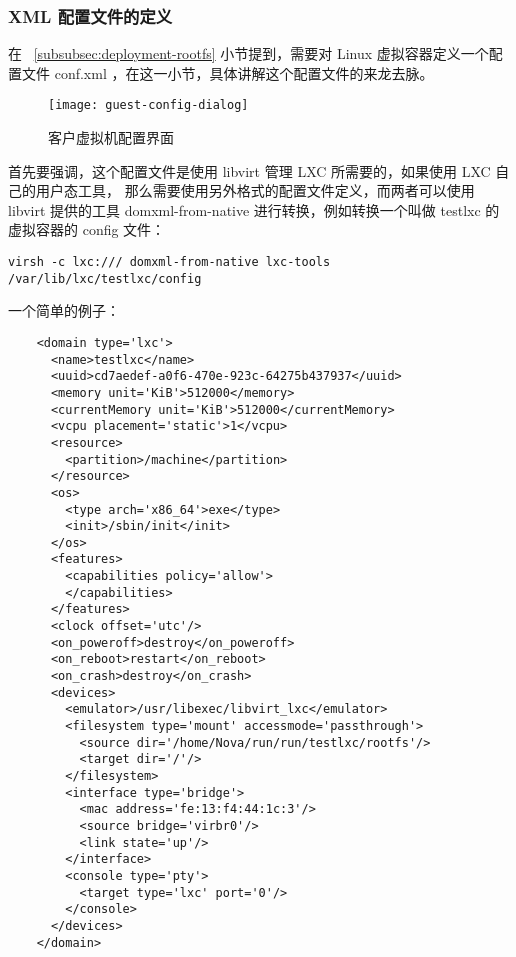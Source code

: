 \subsubsection{XML 配置文件的定义}
\label{subsubsec:xml-definition}

在 ~\ref{subsubsec:deployment-rootfs} 小节提到，需要对 Linux 虚拟容器定义一个配置文件
conf.xml ，在这一小节，具体讲解这个配置文件的来龙去脉。

\begin{figure}[h]
    \centering
    \texttt{[image: guest-config-dialog]}
    \caption{客户虚拟机配置界面}
    \label{fig:guest-config-dialog}
\end{figure}

首先要强调，这个配置文件是使用 libvirt 管理 LXC 所需要的，如果使用 LXC 自己的用户态工具，
那么需要使用另外格式的配置文件定义，而两者可以使用 libvirt 提供的工具 domxml-from-native
进行转换，例如转换一个叫做 testlxc 的虚拟容器的 config 文件：

\begin{lstlisting}
virsh -c lxc:/// domxml-from-native lxc-tools /var/lib/lxc/testlxc/config
\end{lstlisting}

一个简单的例子：

\begin{lstlisting}
    <domain type='lxc'>
      <name>testlxc</name>
      <uuid>cd7aedef-a0f6-470e-923c-64275b437937</uuid>
      <memory unit='KiB'>512000</memory>
      <currentMemory unit='KiB'>512000</currentMemory>
      <vcpu placement='static'>1</vcpu>
      <resource>
        <partition>/machine</partition>
      </resource>
      <os>
        <type arch='x86_64'>exe</type>
        <init>/sbin/init</init>
      </os>
      <features>
        <capabilities policy='allow'>
        </capabilities>
      </features>
      <clock offset='utc'/>
      <on_poweroff>destroy</on_poweroff>
      <on_reboot>restart</on_reboot>
      <on_crash>destroy</on_crash>
      <devices>
        <emulator>/usr/libexec/libvirt_lxc</emulator>
        <filesystem type='mount' accessmode='passthrough'>
          <source dir='/home/Nova/run/run/testlxc/rootfs'/>
          <target dir='/'/>
        </filesystem>
        <interface type='bridge'>
          <mac address='fe:13:f4:44:1c:3'/>
          <source bridge='virbr0'/>
          <link state='up'/>
        </interface>
        <console type='pty'>
          <target type='lxc' port='0'/>
        </console>
      </devices>
    </domain>
\end{lstlisting}

